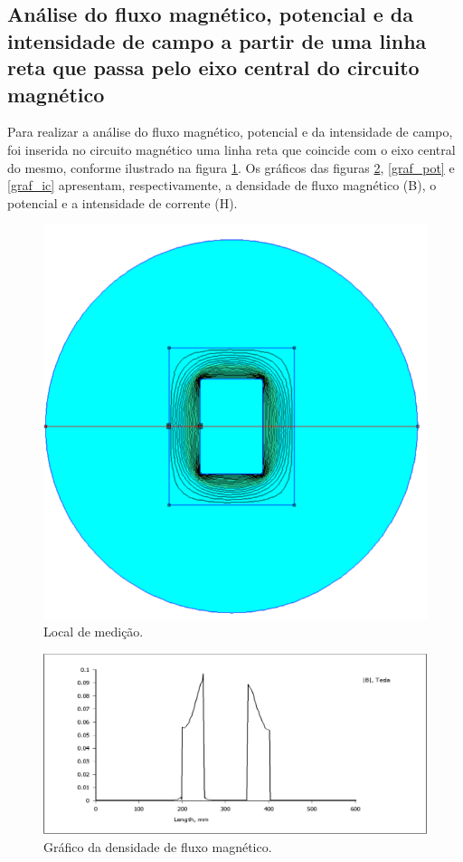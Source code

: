 \subsection{Análise do fluxo magnético, potencial e da intensidade de campo a partir de uma linha reta que passa pelo eixo central do circuito magnético}

Para realizar a análise do fluxo magnético, potencial e da intensidade de campo, foi inserida no circuito magnético uma linha reta que coincide com o eixo central do mesmo, conforme ilustrado na figura \ref{loc_med}. Os gráficos das figuras \ref{graf_dfm}, \ref{graf_pot} e \ref{graf_ic} apresentam, respectivamente, a densidade de fluxo magnético (B), o potencial e a intensidade de corrente (H).

\begin{figure}[H]
\centering
\includegraphics[scale=0.65]{img/linha_1.png}
\caption[Local de medição]{Local de medição.}
\label{loc_med}
\end{figure}

\begin{figure}[H]
\centering
\includegraphics[scale=0.3]{img/linha_B.png}
\caption[Gráfico da densidade de fluxo magnético]{Gráfico da densidade de fluxo magnético.}
\label{graf_dfm}
\end{figure}

